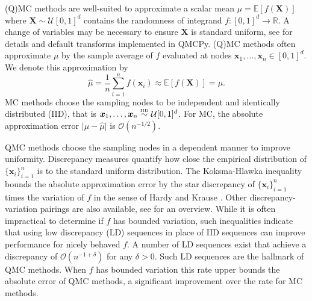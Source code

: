 \documentclass[graybox]{svmult}
\begin{document}
(Q)MC methods are well-suited to approximate a scalar mean $\mu = \mathbb{E}[f(\boldsymbol{X})]$ where $\boldsymbol{X} \sim \mathcal{U}[0,1]^d$ contains the randomness of integrand $f: [0,1]^{d} \to \mathbb{R}$. A change of variables may be necessary to ensure $\boldsymbol{X}$ is standard uniform, see \cite{QMCSoftware} for details and default transforms implemented in QMCPy. 
(Q)MC methods often approximate $\mu$ by the sample average of $f$ evaluated at nodes $\boldsymbol{x}_1,\dots,\boldsymbol{x}_n \in [0,1]^d$. We denote this approximation by  
\begin{equation}
    \label{SoRa_eq:mcapprox}
    \hat{\mu} = \frac{1}{n}\sum_{i=1}^n f(\boldsymbol{x}_i) \approx \mathbb{E}[f(\boldsymbol{X})] = \mu. 
\end{equation}
MC methods choose the sampling nodes to be independent and identically distributed (IID), that is $\boldsymbol{x}_1,\dots,\boldsymbol{x}_n \overset{\text{\tiny IID}}{\sim} \mathcal{U}[0,1]^{d}$. For MC, the absolute approximation error $\lvert \mu - \hat{\mu} \rvert$ is $\mathcal{O}(n^{-1/2})$. 

QMC methods choose the sampling nodes in a dependent manner to improve uniformity. Discrepancy measures quantify how close the empirical distribution of $\{\boldsymbol{x}_i\}_{i=1}^n$ is to the standard uniform distribution. The Koksma-Hlawka inequality bounds the absolute approximation error by the star discrepancy of $\{\boldsymbol{x}_i\}_{i=1}^n$ times the variation of $f$ in the sense of Hardy and Krause \cite{dick2013high}. Other discrepancy-variation pairings are also available, see \cite{hickernell1998generalized} for an overview. While it is often impractical to determine if $f$ has bounded variation, such inequalities indicate that using low discrepancy (LD) sequences in place of IID sequences can improve performance for nicely behaved $f$. A number of LD sequences exist that achieve a discrepancy of $\mathcal{O}(n^{-1+\delta})$ for any $\delta > 0$. Such LD sequences are the hallmark of QMC methods. When $f$ has bounded variation this rate upper bounds the absolute error of QMC methods, a significant improvement over the rate for MC methods. %
\end{document}
